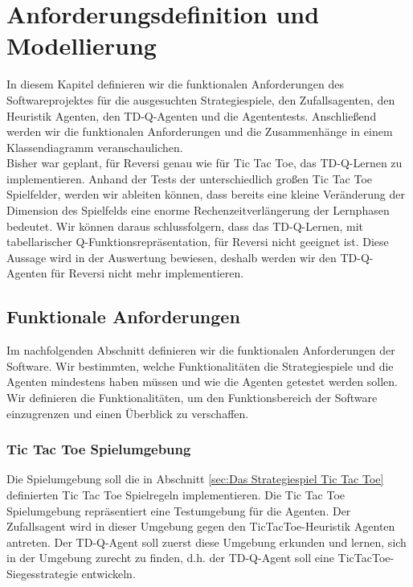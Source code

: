 \chapter{Anforderungsdefinition und Modellierung}
\label{cha:Anforderungsdefinition und Modellierung}

In diesem Kapitel definieren wir die funktionalen Anforderungen des Softwareprojektes für die ausgesuchten Strategiespiele, den Zufallsagenten, den Heuristik Agenten, den TD-Q-Agenten und die Agententests. Anschließend werden wir die funktionalen Anforderungen und die Zusammenhänge in einem Klassendiagramm veranschaulichen. \\

Bisher war geplant, für Reversi genau wie für Tic Tac Toe, das TD-Q-Lernen zu implementieren. Anhand der Tests der unterschiedlich großen Tic Tac Toe Spielfelder, werden wir ableiten können, dass bereits eine kleine Veränderung der Dimension des Spielfelds eine enorme Rechenzeitverlängerung der Lernphasen bedeutet. Wir können daraus schlussfolgern, dass das TD-Q-Lernen, mit tabellarischer Q-Funktionsrepräsentation, für Reversi nicht geeignet ist. Diese Aussage wird in der Auswertung bewiesen, deshalb werden wir den TD-Q-Agenten für Reversi nicht mehr implementieren. \\

\section{Funktionale Anforderungen}
\label{sec:Funktionale Anforderungen}
Im nachfolgenden Abschnitt definieren wir die funktionalen Anforderungen der Software. Wir bestimmten, welche Funktionalitäten die Strategiespiele und die Agenten mindestens haben müssen und wie die Agenten getestet werden sollen. Wir definieren die Funktionalitäten, um den Funktionsbereich der Software einzugrenzen und einen Überblick zu verschaffen.

\subsection{Tic Tac Toe Spielumgebung}
Die Spielumgebung soll die in Abschnitt \ref{sec:Das Strategiespiel Tic Tac Toe} definierten Tic Tac Toe Spielregeln implementieren. Die Tic Tac Toe Spielumgebung repräsentiert eine Testumgebung für die Agenten. Der Zufallsagent wird in dieser Umgebung gegen den TicTacToe-Heuristik Agenten antreten. Der TD-Q-Agent soll zuerst diese Umgebung erkunden und lernen, sich in der Umgebung zurecht zu finden, d.h. der TD-Q-Agent soll eine TicTacToe-Siegesstrategie entwickeln. 

